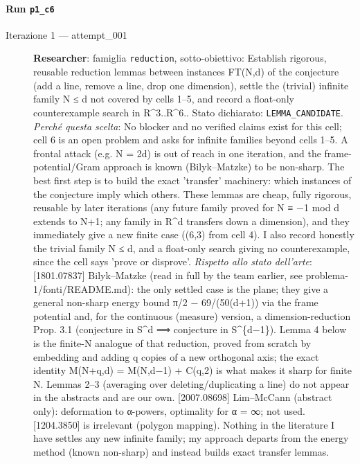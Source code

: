 \documentclass[11pt,a4paper]{article}
\begin{document}
\paragraph{Run \texttt{p1\_c6}}
\begin{description}
\item[Iterazione 1 — attempt\_001]
\textbf{Researcher}: famiglia \texttt{reduction}, sotto-obiettivo: Establish rigorous, reusable reduction lemmas between instances FT(N,d) of the conjecture (add a line, remove a line, drop one dimension), settle the (trivial) infinite family N ≤ d not covered by cells 1–5, and record a float-only counterexample search in R\textasciicircum{}3..R\textasciicircum{}6.. Stato dichiarato: \texttt{LEMMA\_CANDIDATE}.
\emph{Perché questa scelta}: No blocker and no verified claims exist for this cell; cell 6 is an open problem and asks for infinite families beyond cells 1–5. A frontal attack (e.g. N = 2d) is out of reach in one iteration, and the frame-potential/Gram approach is known (Bilyk–Matzke) to be non-sharp. The best first step is to build the exact 'transfer' machinery: which instances of the conjecture imply which others. These lemmas are cheap, fully rigorous, reusable by later iterations (any future family proved for N ≡ −1 mod d extends to N+1; any family in R\textasciicircum{}d transfers down a dimension), and they immediately give a new finite case ((6,3) from cell 4). I also record honestly the trivial family N ≤ d, and a float-only search giving no counterexample, since the cell says 'prove or disprove'.
\emph{Rispetto allo stato dell'arte}: [1801.07837] Bilyk–Matzke (read in full by the team earlier, see problema-1/fonti/README.md): the only settled case is the plane; they give a general non-sharp energy bound π/2 − 69/(50(d+1)) via the frame potential and, for the continuous (measure) version, a dimension-reduction Prop. 3.1 (conjecture in S\textasciicircum{}d ⟹ conjecture in S\textasciicircum{}\{d−1\}). Lemma 4 below is the finite-N analogue of that reduction, proved from scratch by embedding and adding q copies of a new orthogonal axis; the exact identity M(N+q,d) = M(N,d−1) + C(q,2) is what makes it sharp for finite N. Lemmas 2–3 (averaging over deleting/duplicating a line) do not appear in the abstracts and are our own. [2007.08698] Lim–McCann (abstract only): deformation to α-powers, optimality for α = ∞; not used. [1204.3850] is irrelevant (polygon mapping). Nothing in the literature I have settles any new infinite family; my approach departs from the energy method (known non-sharp) and instead builds exact transfer lemmas.

\end{description}
\end{document}
